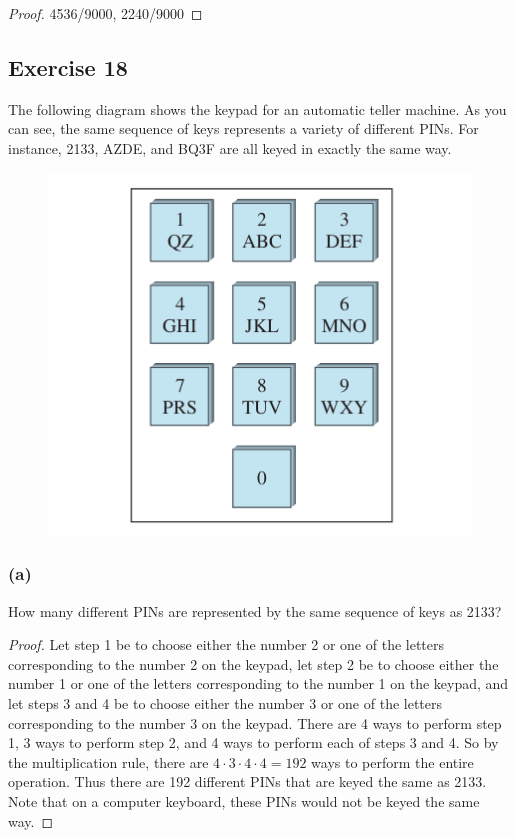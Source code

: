 \documentclass[14pt]{extarticle}
\begin{document}
\begin{proof}
     4536/9000, 2240/9000
\end{proof}

\subsection{Exercise 18}
The following diagram shows the keypad for an automatic teller machine. As you can see, the same sequence of keys
represents a variety of different PINs. For instance, 2133, AZDE, and BQ3F are all keyed in exactly the same way.

\begin{figure}[ht!]
     \centering
     \includegraphics[scale=0.5]{../images/9.2.18.png}
\end{figure}

\subsubsection{(a)}
How many different PINs are represented by the same sequence of keys as 2133?

\begin{proof}
     Let step 1 be to choose either the number 2 or one of the letters corresponding to the number 2 on the keypad, let
     step 2 be to choose either the number 1 or one of the letters corresponding to the number 1 on the keypad, and
     let steps 3 and 4 be to choose either the number 3 or one of the letters corresponding to the number 3 on the keypad.
     There are 4 ways to perform step 1, 3 ways to perform step 2, and 4 ways to perform each of steps 3 and 4. So by the
     multiplication rule, there are \(4 \cdot 3 \cdot 4 \cdot 4 = 192\) ways to perform the entire operation. Thus there
     are 192 different PINs that are keyed the same as 2133. Note that on a computer keyboard, these PINs would not be
     keyed the same way.
\end{proof}
\end{document}
